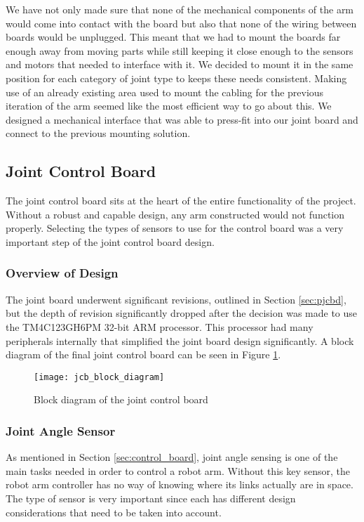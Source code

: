 \noindent We have not only made sure that none of the mechanical components of the arm would come into contact with the board but also that none of the wiring between boards would be unplugged. This meant that we had to mount the boards far enough away from moving parts while still keeping it close enough to the sensors and motors that needed to interface with it. We decided to mount it in the same position for each category of joint type to keeps these needs consistent. Making use of an already existing area used to mount the cabling for the previous iteration of the arm seemed like the most efficient way to go about this. We designed a mechanical interface that was able to press-fit into our joint board and connect to the previous mounting solution.


\subsection{Joint Control Board}
The joint control board sits at the heart of the entire functionality of the project. Without a robust and capable design, any arm constructed would not function properly. Selecting the types of sensors to use for the control board was a very important step of the joint control board design. %

\subsubsection{Overview of Design}
The joint board underwent significant revisions, outlined in Section \ref{sec:pjcbd}, but the depth of revision significantly dropped after the decision was made to use the TM4C123GH6PM 32-bit ARM processor. This processor had many peripherals internally that simplified the joint board design significantly. A block diagram of the final joint control board can be seen in Figure \ref{fig:jcb_block_diagram}.

\begin{figure}[H]
	\centering
	\texttt{[image: jcb\_block\_diagram]}
	\caption{Block diagram of the joint control board}
	\label{fig:jcb_block_diagram}
\end{figure}

\subsubsection{Joint Angle Sensor}
\label{sec:jas}
As mentioned in Section \ref{sec:control_board}, joint angle sensing is one of the main tasks needed in order to control a robot arm. Without this key sensor, the robot arm controller has no way of knowing where its links actually are in space. The type of sensor is very important since each has different design considerations that need to be taken into account.

